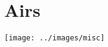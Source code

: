 \documentclass[12pt]{report}
\newcommand*{\cleartoleftpage}{%
  \clearpage
   \ifodd\value{page}\hbox{}\newpage\fi
}
\begin{document}


\cleartoleftpage
\chapter*{Airs}
\begin{center}
\texttt{[image: ../images/misc]}
\end{center}



\end{document}
